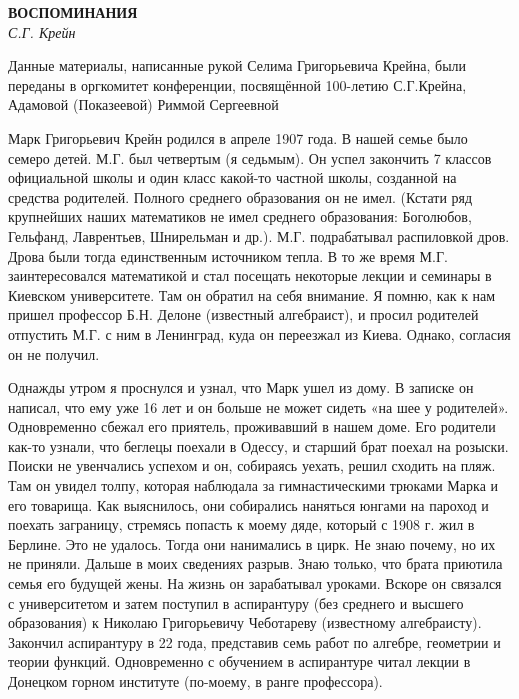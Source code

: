 \begin{center}{ \bf  ВОСПОМИНАНИЯ}\\
{\it С.Г. Крейн} \\
\end{center}
\begin{flushright}
Данные материалы,
написанные рукой Селима Григорьевича Крейна,
были переданы в оргкомитет конференции,
посвящённой 100-летию С.Г.Крейна,
 Адамовой (Показеевой) Риммой  Сергеевной
\end{flushright}

Марк Григорьевич Крейн родился в апреле 1907 года. В нашей семье было семеро детей. М.Г. был четвертым (я седьмым). Он успел закончить 7 классов официальной школы и один класс какой-то частной школы, созданной на средства родителей. Полного среднего образования он не имел. (Кстати ряд крупнейших наших математиков не имел среднего образования: Боголюбов, Гельфанд, Лаврентьев, Шнирельман и др.). М.Г. подрабатывал распиловкой дров. Дрова были тогда единственным источником тепла. В то же время М.Г. заинтересовался математикой и стал посещать некоторые лекции и семинары в Киевском университете. Там он обратил на себя внимание. Я помню, как к нам пришел профессор Б.Н. Делоне (известный алгебраист), и просил родителей отпустить М.Г. с ним в Ленинград, куда он переезжал из Киева. Однако, согласия он не получил.

Однажды утром я проснулся и узнал, что Марк ушел из дому. В записке он написал, что ему уже 16 лет и он больше не может сидеть «на шее у родителей». Одновременно сбежал его приятель, проживавший в нашем доме. Его родители как-то узнали, что беглецы поехали в Одессу, и старший брат поехал на розыски. Поиски не увенчались успехом и он, собираясь уехать, решил сходить на пляж. Там он увидел толпу, которая наблюдала за гимнастическими трюками Марка и его товарища. Как выяснилось, они собирались наняться юнгами на пароход и поехать заграницу, стремясь попасть к моему дяде, который с 1908 г. жил в Берлине. Это не удалось. Тогда они нанимались в цирк. Не знаю почему, но их не приняли. Дальше в моих сведениях разрыв. Знаю только, что брата приютила семья его будущей жены. На жизнь он зарабатывал уроками. Вскоре он связался с университетом и затем поступил в аспирантуру (без среднего и высшего образования) к Николаю Григорьевичу Чеботареву (известному алгебраисту). Закончил аспирантуру в 22 года, представив семь работ по алгебре, геометрии и теории функций. Одновременно с обучением в аспирантуре читал лекции в Донецком горном институте (по-моему, в ранге профессора).

